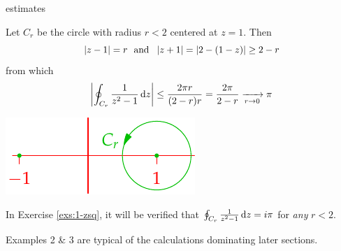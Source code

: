 \begin{examples}{}{estimates}
\begin{enumerate}
	  \begin{minipage}[t]{0.65\linewidth}\vspace{0pt}
			\item\label{ex:estimates3} Let $C_r$ be the circle with radius $r<2$ centered at $z=1$. Then
			\[
				\nm{z-1}=r\ \text{ and }\ \nm{z+1}=\nm{2-(1-z)}\ge 2-r
			\]
			from which
			\[
				\left| \oint_{C_r}\frac 1{z^2-1}\,{\mathrm{d} z}\right|\le\frac{2\pi r}{(2-r)r}=\frac{2\pi}{2-r}\xrightarrow[r\to 0]{}\pi
			\]
		\end{minipage}
		\hfill
		\begin{minipage}[t]{0.34\linewidth}\vspace{0pt}
			\flushright\includegraphics{bound-ex2}
		\end{minipage}\medbreak
		In Exercise \ref{exs:1-zsq}, it will be verified that $\oint_{C_r}\frac 1{z^2-1}\,{\mathrm{d} z}= i\pi$ for \emph{any} $r<2$.
	\end{enumerate}
	Examples 2 \& 3 are typical of the calculations dominating later sections.
\end{examples}


